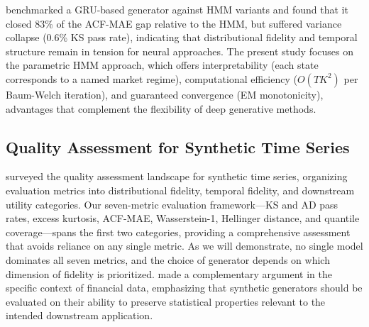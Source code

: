 \citet{alswaidan2026hybrid} benchmarked a GRU-based generator against HMM variants and found that it closed 83\% of the ACF-MAE gap relative to the HMM, but suffered variance collapse (0.6\% KS pass rate), indicating that distributional fidelity and temporal structure remain in tension for neural approaches.
The present study focuses on the parametric HMM approach, which offers interpretability (each state corresponds to a named market regime), computational efficiency ($O(TK^2)$ per Baum-Welch iteration), and guaranteed convergence (EM monotonicity), advantages that complement the flexibility of deep generative methods.

\subsection{Quality Assessment for Synthetic Time Series}

\citet{stenger2024thinking} surveyed the quality assessment landscape for synthetic time series, organizing evaluation metrics into distributional fidelity, temporal fidelity, and downstream utility categories.
Our seven-metric evaluation framework---KS and AD pass rates, excess kurtosis, ACF-MAE, Wasserstein-1, Hellinger distance, and quantile coverage---spans the first two categories, providing a comprehensive assessment that avoids reliance on any single metric.
As we will demonstrate, no single model dominates all seven metrics, and the choice of generator depends on which dimension of fidelity is prioritized.
\citet{assefa2020generating} made a complementary argument in the specific context of financial data, emphasizing that synthetic generators should be evaluated on their ability to preserve statistical properties relevant to the intended downstream application.
